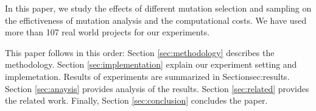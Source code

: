 \begin{comment}
  These approach relies on the fact that some of the mutagens generate a large number of variants, and hence produce highly redundant test cases. Previous research suggested that elimination of mutagens with high fertility results in the reduction of total number of mutations produced, and hence reduces the computational requirements.


  It was recently questioned whether this approach indeed resulted in a tangible improvement over random selection of mutants\cite{zhang2010operator}, which did not find operator based selection to be better than random selection. 


  Another research, initially by Unch\cite{untch2009onreduced} and recently by Deng et al.\cite{deng2013empirical} suggests using software deletion operator since it produces the least number of mutants (smallest neighborhood). The researchers were able to obtain a close approximation of original mutant score with significant savings with this approach.

  However, our previous research suggests that mutation coverage is closely predicted by statement coverage, this suggests that any criteria that forces accounting of the impact of each statement should provide a close approximation to the full mutation score. Hence, our research suggests that SDL works because it forces accounting of each line, and a random sampling criteria that provides the same criteria should result in similar results.

  In our analysis, we find that a random sampling approach that randomly chose a single mutant per line was found to have a better correlation with the full mutation score than that obtained by SDL. Further it was also found that the mutation score produced by random sampling was closer to the full mutation score than that produced by SDL.
\end{comment}


In this paper, we study the effects of different mutation selection and sampling on the effictiveness of 
mutation analysis and the computational costs. We have used more than 107 real world projects for our
experiments. 

This paper follows in this order: Section \ref{sec:methodology} describes the methodology.
Section \ref{sec:implementation} explain our experiment setting and implemetation.
Results of experiments are summarized in Section{sec:results}. Section \ref{sec:anaysis}
provides analysis of the results. Section \ref{sec:related} provides the related work. 
Finally, Section \ref{sec:conclusion} concludes the paper.